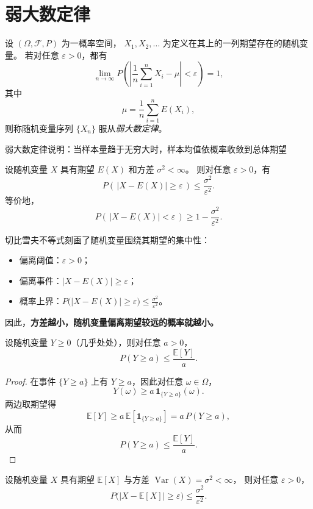 \section{弱大数定律}

\begin{definition}[弱大数定律]
设 $(\Omega,\mathcal{F},P)$ 为一概率空间，
$X_1,X_2,\dots$ 为定义在其上的一列期望存在的随机变量。
若对任意 $\varepsilon>0$，都有
\[
\lim_{n\to\infty}
P\!\left(
\left|
\frac{1}{n}\sum_{i=1}^n X_i-\mu
\right|<\varepsilon
\right)=1,
\]
其中
\[
\mu=\frac{1}{n}\sum_{i=1}^n E(X_i),
\]
则称随机变量序列 $\{X_n\}$ 服从\emph{弱大数定律}。
\end{definition}
弱大数定律说明：当样本量趋于无穷大时，样本均值依概率收敛到总体期望
\begin{definition}[切比雪夫不等式]

设随机变量 $X$ 具有期望 $E(X)$ 和方差 $\sigma^2<\infty$。
则对任意 $\varepsilon>0$，有
\[
P\!\left(\,|X-E(X)|\ge \varepsilon\,\right)
\le
\frac{\sigma^2}{\varepsilon^2}.
\]
等价地，
\[
P\!\left(\,|X-E(X)|< \varepsilon\,\right)
\ge
1-\frac{\sigma^2}{\varepsilon^2}.
\]
\end{definition}
\begin{note}[切比雪夫不等式的含义]
切比雪夫不等式刻画了随机变量围绕其期望的集中性：
\begin{itemize}
  \item 偏离阈值：$\varepsilon>0$；
  \item 偏离事件：$\lvert X-E(X)\rvert\ge\varepsilon$；
  \item 概率上界：$\displaystyle P\bigl(\lvert X-E(X)\rvert\ge\varepsilon\bigr)
  \le \frac{\sigma^{2}}{\varepsilon^{2}}$。
\end{itemize}
因此，\textbf{方差越小，随机变量偏离期望较远的概率就越小。}
\end{note}
\begin{theorem}
设随机变量 $Y\ge 0$（几乎处处），则对任意 $a>0$，
\[
P(Y\ge a)\le \frac{\mathbb E[Y]}{a}.
\]
\end{theorem}

\begin{proof}
在事件 $\{Y\ge a\}$ 上有 $Y\ge a$，因此对任意 $\omega\in\Omega$，
\[
Y(\omega)\ge a\,\mathbf 1_{\{Y\ge a\}}(\omega).
\]
两边取期望得
\[
\mathbb E[Y]\ge a\,\mathbb E\!\left[\mathbf 1_{\{Y\ge a\}}\right]
= a\,P(Y\ge a),
\]
从而
\[
P(Y\ge a)\le \frac{\mathbb E[Y]}{a}.
\]
\end{proof}

\begin{theorem}
设随机变量 $X$ 具有期望 $\mathbb E[X]$ 与方差
$\operatorname{Var}(X)=\sigma^2<\infty$，
则对任意 $\varepsilon>0$，
\[
P\bigl(|X-\mathbb E[X]|\ge \varepsilon\bigr)
\le \frac{\sigma^2}{\varepsilon^2}.
\]
\end{theorem}

